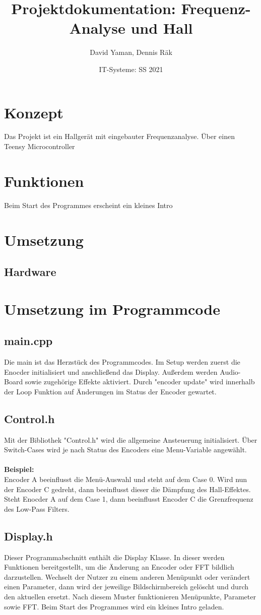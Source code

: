 \documentclass[12pt]{article}
\title{Projektdokumentation: Frequenz-Analyse und Hall}        %
\author{David Yaman, Dennis Räk}            %
\date{IT-Systeme: SS 2021}                    %
\begin{document}
\maketitle
\newpage
\tableofcontents
\newpage
\section{Konzept}
Das Projekt ist ein Hallgerät mit eingebauter Frequenzanalyse. Über einen Teensy Microcontroller
\section{Funktionen}
Beim Start des Programmes erscheint ein kleines Intro
\section{Umsetzung}
\subsection{Hardware}
\newpage
\section{Umsetzung im Programmcode}
\subsection{main.cpp}
Die main ist das Herzstück des Programmcodes. Im Setup werden zuerst die Enocder initialisiert und anschließend das Display. 
Außerdem werden Audio-Board sowie zugehörige Effekte aktiviert. 
Durch "encoder update" wird innerhalb der Loop Funktion auf Änderungen im Status der Encoder gewartet.
\subsection{Control.h}
Mit der Bibliothek "Control.h" wird die allgemeine Ansteuerung initialisiert. Über Switch-Cases wird je nach Status des Encoders eine Menu-Variable angewählt. 
\\
\\
\textbf{Beispiel:}
\\
Encoder A beeinflusst die Menü-Auswahl und steht auf dem Case 0. Wird nun der Encoder C gedreht, dann beeinflusst dieser die Dämpfung des Hall-Effektes.
Steht Enocder A auf dem Case 1, dann beeinflusst Encoder C die Grenzfrequenz des Low-Pass Filters.
\subsection{Display.h}
Dieser Programmabschnitt enthält die Display Klasse. In dieser werden Funktionen bereitgestellt, um die Änderung an Encoder oder FFT bildlich darzustellen.  
Wechselt der Nutzer zu einem anderen Menüpunkt oder verändert einen Parameter, dann wird der jeweilige Bildschirmbereich gelöscht und durch den aktuellen ersetzt. 
Nach diesem Muster funktionieren Menüpunkte, Parameter sowie FFT. Beim Start des Programmes wird ein kleines Intro geladen.
\end{document}
